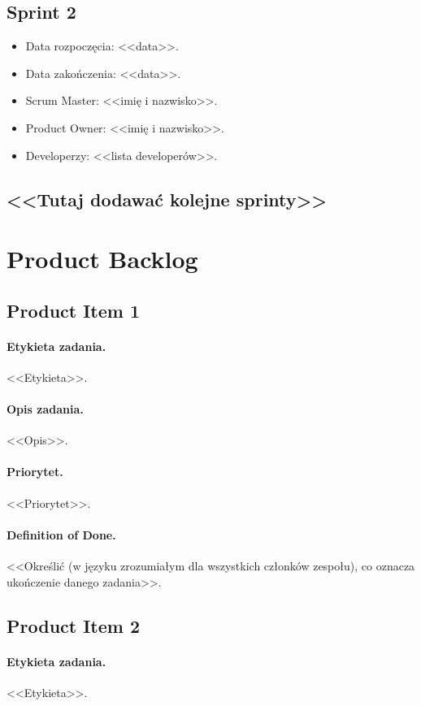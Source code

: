 \documentclass[a4paper]{article}
\begin{document}
\subsection{Sprint 2}

\begin{itemize}
\item Data rozpoczęcia: <<data>>.
\item  Data zakończenia: <<data>>.
\item Scrum Master: <<imię i nazwisko>>.
\item Product Owner: <<imię i nazwisko>>.
\item Developerzy: <<lista developerów>>.
\end{itemize}

\subsection*{<<Tutaj dodawać kolejne sprinty>>}

\section{Product Backlog}

\subsection{Product Item 1}
\paragraph{Etykieta zadania.} <<Etykieta>>.
\paragraph{Opis zadania.} <<Opis>>.
\paragraph{Priorytet.} <<Priorytet>>.
\paragraph{Definition of Done.} <<Określić (w języku zrozumiałym dla wszystkich członków zespołu), co oznacza ukończenie danego zadania>>.

\subsection{Product Item 2}
\paragraph{Etykieta zadania.} <<Etykieta>>.
\end{document}
